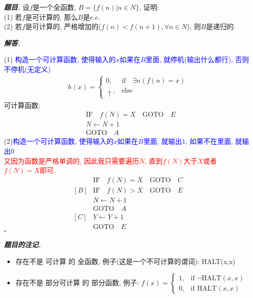 \documentclass[10pt, a4paper, oneside]{ctexart}
\newenvironment{problem}{\begin{framed}\par\noindent\textbf{\textit{题目. }}}{\end{framed}\par}
\newenvironment{solution}{%
  \par\noindent\textbf{\textit{解答. }}\ignorespaces
}{%
  \hfill\ensuremath{\square}\par
}
\newenvironment{note}{\par\noindent\textbf{\textit{题目的注记. }}\ignorespaces}{\par}
\begin{document}
\begin{problem}
设$f$是一个全函数, $B=\{f(n)| n\in N\}$, 证明:\\
(1) 若$f$是可计算的, 那么$B$是$r.e.$\\
(2) 若$f$是可计算的, 严格增加的($f(n)<f(n+1), \forall n\in N$), 则$B$是递归的.
\end{problem}
\begin{solution}
    (1) \textcolor{blue}{构造一个可计算函数, 使得输入的$x$如果在$B$里面, 就停机(输出什么都行), 否则不停机(无定义)}
    \begin{align*}
        h(x) = \begin{cases}
            0, &\text{if} \quad \exists n (f(n)=x)\\
            \uparrow, &\text{else}
        \end{cases}
    \end{align*}
    可计算函数:
    \begin{align*}
        [A] &\text{IF} \quad f(N)=X\quad \text{GOTO} \quad E\\
        & N\leftarrow N+1\\
        & \text{GOTO} \quad A
    \end{align*}
    (2)\textcolor{blue}{构造一个可计算函数, 使得输入的$x$如果在$B$里面, 就输出$1$, 如果不在里面, 就输出$0$}\\
    \textcolor{red}{又因为函数是严格单调的, 因此我只需要遍历$N$, 直到$f(N)$大于$X$或者$f(N)=X$即可.}
    \begin{align*}
        [A] &\text{IF} \quad f(N)=X\quad \text{GOTO} \quad C\\
        [B] &\text{IF} \quad f(N)>X\quad \text{GOTO} \quad E\\
        & N\leftarrow N+1\\
        & \text{GOTO} \quad A\\
        [C]& Y\leftarrow Y+1\\
        & \text{GOTO} \quad E
    \end{align*}
\end{solution}
\begin{note}
    \begin{itemize}
        \item 存在不是 可计算 的 全函数, 例子(这是一个不可计算的谓词): HALT(x,x)
        \item 存在不是 部分可计算 的 部分函数, 例子: $f(x)= \begin{cases}
            1, & \text{if } \neg \text{HALT}(x,x)\\
            0, & \text{if } \text{HALT}(x,x)
        \end{cases}$
    \end{itemize}
\end{note}
\end{document}
